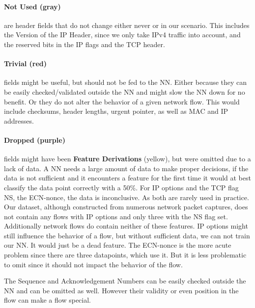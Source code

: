 \documentclass[
	ngerman,
	ruledheaders=section,%
	class=report,%
	thesis={type=bachelor},%
	accentcolor=9c,%
	custommargins=true,%
	marginpar=false,%
	parskip=half-,%
	fontsize=11pt,%
]{tudapub}
\begin{document}
\paragraph{\colorbox{not}{\textbf{{Not Used} (gray)}}} are header fields that do not change either never or in our scenario.
This includes the Version of the IP Header, since we only take IPv4 traffic into account,
and the reserved bits in the IP flags and the TCP header.

\paragraph{\colorbox{trivial}{\textbf{Trivial} (red)}} fields might be useful, but should not be fed to the NN.
Either because they can be easily checked/validated outside the NN and might slow the NN down for no benefit.
Or they do not alter the behavior of a given network flow.
This would include checksums, header lengths, urgent pointer, as well as MAC and IP addresses.

\paragraph{\colorbox{dropped}{\textbf{Dropped} (purple)}} fields might have been \colorbox{derivation}{\textbf{Feature Derivations} (yellow)}, but were omitted due to a lack of data.
A NN needs a large amount of data to make proper decisions, if the data is not sufficient and it encounters a feature for the first time it would at best classify the data point correctly with a 50\%.
For IP options and the TCP flag NS, the ECN-nonce, the data is inconclusive.
As both are rarely used in practice.
Our dataset, although constructed from numerous network packet captures, does not contain any flows with IP options and only three with the NS flag set.
Additionally network flows do contain neither of these features.
IP options might still influence the behavior of a flow, but without sufficient data, we can not train our NN.
It would just be a dead feature.
The ECN-nonce is the more acute problem since there are three datapoints, which use it.
But it is less problematic to omit since it should not impact the behavior of the flow.

The Sequence and Acknowledgement Numbers can be easily checked outside the NN and can be omitted as well.
However their validity or even position in the flow can make a flow special.
\end{document}
